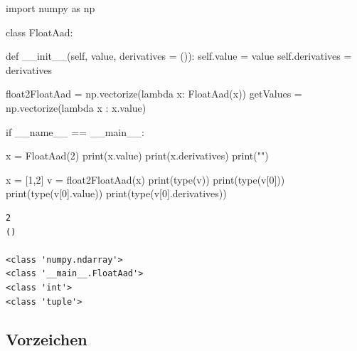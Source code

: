 \documentclass[
  a4paper,
  DIV=11]{scrreprt}
\newenvironment{Shaded}{\begin{snugshade}}{\end{snugshade}}
\newcommand{\BuiltInTok}[1]{\textcolor[rgb]{0.00,0.23,0.31}{#1}}
\newcommand{\ControlFlowTok}[1]{\textcolor[rgb]{0.00,0.23,0.31}{#1}}
\newcommand{\DecValTok}[1]{\textcolor[rgb]{0.68,0.00,0.00}{#1}}
\newcommand{\FunctionTok}[1]{\textcolor[rgb]{0.28,0.35,0.67}{#1}}
\newcommand{\ImportTok}[1]{\textcolor[rgb]{0.00,0.46,0.62}{#1}}
\newcommand{\KeywordTok}[1]{\textcolor[rgb]{0.00,0.23,0.31}{#1}}
\newcommand{\NormalTok}[1]{\textcolor[rgb]{0.00,0.23,0.31}{#1}}
\newcommand{\OperatorTok}[1]{\textcolor[rgb]{0.37,0.37,0.37}{#1}}
\newcommand{\StringTok}[1]{\textcolor[rgb]{0.13,0.47,0.30}{#1}}
\newcommand{\VariableTok}[1]{\textcolor[rgb]{0.07,0.07,0.07}{#1}}
\theoremstyle{definition}
\theoremstyle{definition}
\theoremstyle{remark}
\begin{document}
\begin{Shaded}
\begin{Highlighting}[]
\ImportTok{import}\NormalTok{ numpy }\ImportTok{as}\NormalTok{ np}

\KeywordTok{class}\NormalTok{ FloatAad:}

    \KeywordTok{def} \FunctionTok{\_\_init\_\_}\NormalTok{(}\VariableTok{self}\NormalTok{, value, derivatives }\OperatorTok{=}\NormalTok{ ()):}
        \VariableTok{self}\NormalTok{.value }\OperatorTok{=}\NormalTok{ value}
        \VariableTok{self}\NormalTok{.derivatives }\OperatorTok{=}\NormalTok{ derivatives}

\NormalTok{float2FloatAad }\OperatorTok{=}\NormalTok{ np.vectorize(}\KeywordTok{lambda}\NormalTok{ x: FloatAad(x))}
\NormalTok{getValues }\OperatorTok{=}\NormalTok{ np.vectorize(}\KeywordTok{lambda}\NormalTok{ x : x.value)}

\ControlFlowTok{if} \VariableTok{\_\_name\_\_} \OperatorTok{==} \StringTok{\textquotesingle{}\_\_main\_\_\textquotesingle{}}\NormalTok{:}

\NormalTok{    x }\OperatorTok{=}\NormalTok{ FloatAad(}\DecValTok{2}\NormalTok{)}
    \BuiltInTok{print}\NormalTok{(x.value)}
    \BuiltInTok{print}\NormalTok{(x.derivatives)}
    \BuiltInTok{print}\NormalTok{(}\StringTok{""}\NormalTok{)}

\NormalTok{    x }\OperatorTok{=}\NormalTok{ [}\DecValTok{1}\NormalTok{,}\DecValTok{2}\NormalTok{]}
\NormalTok{    v }\OperatorTok{=}\NormalTok{ float2FloatAad(x)}
    \BuiltInTok{print}\NormalTok{(}\BuiltInTok{type}\NormalTok{(v))}
    \BuiltInTok{print}\NormalTok{(}\BuiltInTok{type}\NormalTok{(v[}\DecValTok{0}\NormalTok{]))}
    \BuiltInTok{print}\NormalTok{(}\BuiltInTok{type}\NormalTok{(v[}\DecValTok{0}\NormalTok{].value))}
    \BuiltInTok{print}\NormalTok{(}\BuiltInTok{type}\NormalTok{(v[}\DecValTok{0}\NormalTok{].derivatives))}
\end{Highlighting}
\end{Shaded}

\begin{verbatim}
2
()

<class 'numpy.ndarray'>
<class '__main__.FloatAad'>
<class 'int'>
<class 'tuple'>
\end{verbatim}

\hypertarget{vorzeichen-1}{%
\subsection{Vorzeichen}\label{vorzeichen-1}}
\end{document}
